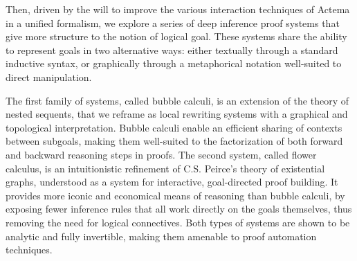 
Then, driven by the will to improve the various interaction techniques of Actema
in a unified formalism, we explore a series of deep inference proof systems that
give more structure to the notion of logical goal. These systems share the
ability to represent goals in two alternative ways: either textually through a
standard inductive syntax, or graphically through a metaphorical notation
well-suited to direct manipulation.

The first family of systems, called bubble calculi, is an extension of the
theory of nested sequents, that we reframe as local rewriting systems with a
graphical and topological interpretation. Bubble calculi enable an efficient
sharing of contexts between subgoals, making them well-suited to the
factorization of both forward and backward reasoning steps in proofs. The second
system, called flower calculus, is an intuitionistic refinement of C.S. Peirce's
theory of existential graphs, understood as a system for interactive,
goal-directed proof building. It provides more iconic and economical means of
reasoning than bubble calculi, by exposing fewer inference rules that all work
directly on the goals themselves, thus removing the need for logical
connectives.
Both types of systems are shown to be analytic and fully invertible, making them
amenable to proof automation techniques.


